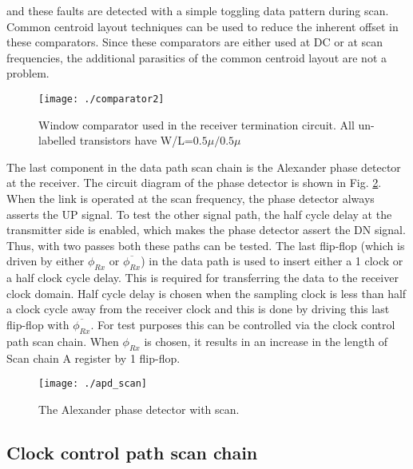 \documentclass[conference]{IEEEtran}
\begin{document}
and these faults are detected with a simple toggling data pattern during scan.
Common centroid layout techniques can be used to reduce the inherent 
offset in these comparators. Since these comparators are either used at 
DC or at scan frequencies, the additional parasitics of the common centroid
layout are not a problem.
\begin{figure}[h!]
\centering
{}
\texttt{[image: ./comparator2]}
\caption{Window comparator used in the receiver termination circuit. All
un-labelled transistors have W/L=$0.5\mu /0.5\mu$}
\label{fig:window-comp-100}
\end{figure}

The last component in the data path scan chain is the Alexander phase
detector at the receiver. The circuit diagram of the phase detector is shown in
Fig. \ref{fig:apd-scan}. When the link is operated at the scan frequency,
the phase detector always asserts the UP signal. To test the other signal path,
the half cycle delay at the transmitter side is enabled, which makes the phase
detector assert the DN signal. Thus, with two passes both these paths
can be tested. The last flip-flop (which is driven
by either $\phi _{Rx}$ or $\overline{\phi _{Rx}}$) in the data path is 
used to insert either a 1 clock or a half clock cycle delay.
This is required for transferring the
data to the receiver clock domain. Half cycle delay is chosen when the 
sampling clock is less than half
a clock cycle away from the receiver clock and this is done
by driving this last flip-flop with $\overline{\phi _{Rx}}$.
For test purposes this can be
controlled via the clock control path scan chain.
When $\phi_{Rx}$ is chosen, it results in an increase in the length of 
Scan chain A register by 1 flip-flop.

\begin{figure}
\centering
{}
\texttt{[image: ./apd\_scan]}
\caption{The Alexander phase detector with scan.}
\label{fig:apd-scan}
\end{figure}

\subsection{Clock control path scan chain}
\end{document}
